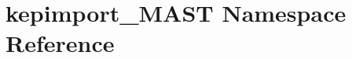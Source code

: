 \hypertarget{namespacekepimport__MAST}{\section{kepimport\-\_\-\-M\-A\-S\-T Namespace Reference}
\label{namespacekepimport__MAST}
}
